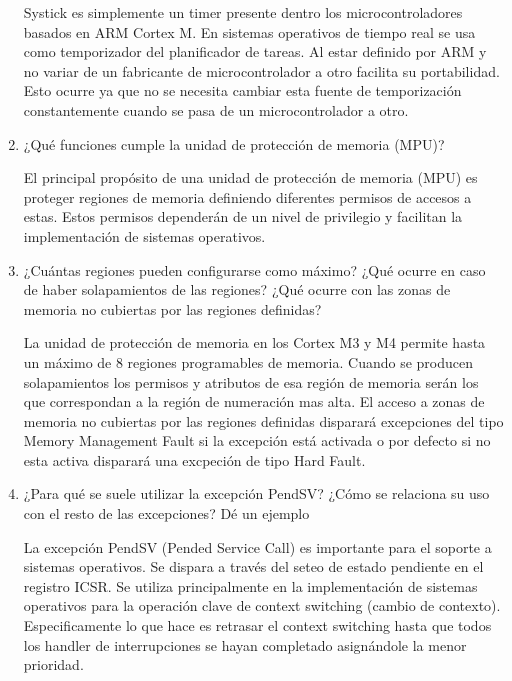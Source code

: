 \documentclass[12pt, a4paper]{article}
\makeatletter
\newcommand\setItemnumber[1]{\setcounter{enum\romannumeral\@enumdepth}{\numexpr#1-1\relax}}
\makeatother
\begin{document}
\begin{enumerate}
    Systick es simplemente un timer presente dentro los microcontroladores basados en ARM Cortex M. 
    En sistemas operativos de tiempo real se usa como temporizador del planificador de tareas. Al 
    estar definido por ARM y no variar de un fabricante de microcontrolador a otro facilita
    su portabilidad. Esto ocurre ya que no se necesita cambiar esta fuente de temporización 
    constantemente cuando se pasa de un microcontrolador a otro.
    
    \setItemnumber{18}
    \item ¿Qué funciones cumple la unidad de protección de memoria (MPU)?
    
    El principal propósito de una unidad de protección de memoria (MPU) es proteger regiones de
    memoria definiendo diferentes permisos de accesos a estas. Estos permisos dependerán de un 
    nivel de privilegio y facilitan la implementación de sistemas operativos.
    
    \setItemnumber{19}
    \item¿Cuántas regiones pueden configurarse como máximo? ¿Qué ocurre en caso de haber solapamientos de 
    las regiones? ¿Qué ocurre con las zonas de memoria no cubiertas por las regiones definidas?
    
    La unidad de protección de memoria en los Cortex M3 y M4 permite hasta un máximo de 8 regiones 
    programables de memoria. Cuando se producen solapamientos los permisos y atributos de esa región de 
    memoria serán los que correspondan a la región de numeración mas alta. El acceso  a zonas de memoria 
    no cubiertas por las regiones definidas disparará excepciones del tipo Memory Management Fault si 
    la excepción está activada o por defecto si no esta activa disparará una excpeción de tipo Hard Fault.
    
    
    \setItemnumber{20}
    \item ¿Para qué se suele utilizar la excepción PendSV? ¿Cómo se relaciona su uso con el resto 
    de las excepciones? Dé un ejemplo
    
    La excepción PendSV (Pended Service Call) es importante para el soporte a sistemas operativos.
    Se dispara a través del seteo de estado pendiente en el registro ICSR. Se utiliza principalmente 
    en la implementación de sistemas operativos para la operación clave de context switching 
    (cambio de contexto). Especificamente lo que hace es retrasar el context switching hasta que 
    todos los handler de interrupciones se hayan completado asignándole la menor prioridad.
    

\end{enumerate}
\end{document}
